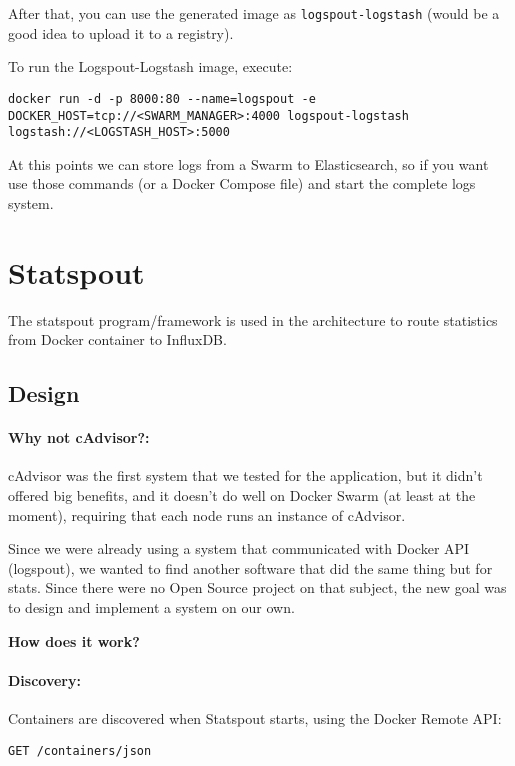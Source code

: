 After that, you can use the generated image as 
\texttt{logspout-logstash} (would be a good idea to upload it to a registry).

To run the Logspout-Logstash image, execute:

\begin{lstlisting}
docker run -d -p 8000:80 --name=logspout -e DOCKER_HOST=tcp://<SWARM_MANAGER>:4000 logspout-logstash logstash://<LOGSTASH_HOST>:5000
\end{lstlisting}

At this points we can store logs from a Swarm to Elasticsearch, so if you want use those commands (or a Docker Compose file) and start the complete logs system.

\section{Statspout}

The statspout program/framework is used in the architecture to route statistics from Docker container to InfluxDB.

\subsection{Design}

\paragraph{Why not cAdvisor?:} cAdvisor was the first system that we tested for the application, but it didn't offered big benefits, and it doesn't do well on Docker Swarm (at least at the moment), requiring that each node runs an instance of cAdvisor.

Since we were already using a system that communicated with Docker API (logspout), we wanted to find another software that did the same thing but for stats. Since there were no Open Source project on that subject, the new goal was to design and implement a system on our own.

\begin{center}
\textbf{How does it work?}
\end{center}

\paragraph{Discovery:} Containers are discovered when Statspout starts, using the Docker Remote API:

\begin{lstlisting}
GET /containers/json
\end{lstlisting}

